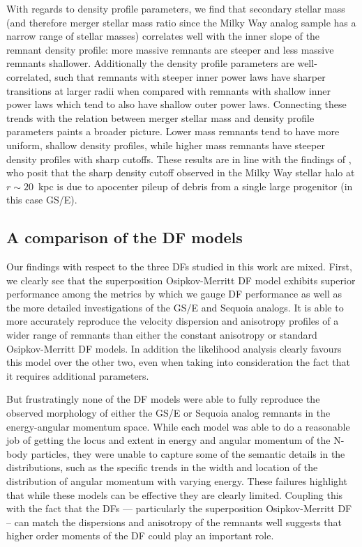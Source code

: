 With regards to density profile parameters, we find that secondary stellar mass (and therefore merger stellar mass ratio since the Milky Way analog sample has a narrow range of stellar masses) correlates well with the inner slope of the remnant density profile: more massive remnants are steeper and less massive remnants shallower. Additionally the density profile parameters are well-correlated, such that remnants with steeper inner power laws have sharper transitions at larger radii when compared with remnants with shallow inner power laws which tend to also have shallow outer power laws. Connecting these trends with the relation between merger stellar mass and density profile parameters paints a broader picture. Lower mass remnants tend to have more uniform, shallow density profiles, while higher mass remnants have steeper density profiles with sharp cutoffs. These results are in line with the findings of \textcite{deason18}, who posit that the sharp density cutoff observed in the Milky Way stellar halo at $r \sim 20$~kpc is due to apocenter pileup of debris from a single large progenitor (in this case GS/E).

\subsection{A comparison of the DF models}

Our findings with respect to the three DFs studied in this work are mixed. First, we clearly see that the superposition Osipkov-Merritt DF model exhibits superior performance among the metrics by which we gauge DF performance as well as the more detailed investigations of the GS/E and Sequoia analogs. It is able to more accurately reproduce the velocity dispersion and anisotropy profiles of a wider range of remnants than either the constant anisotropy or standard Osipkov-Merritt DF models. In addition the likelihood analysis clearly favours this model over the other two, even when taking into consideration the fact that it requires additional parameters.

But frustratingly none of the DF models were able to fully reproduce the observed morphology of either the GS/E or Sequoia analog remnants in the energy-angular momentum space. While each model was able to do a reasonable job of getting the locus and extent in energy and angular momentum of the N-body particles, they were unable to capture some of the semantic details in the distributions, such as the specific trends in the width and location of the distribution of angular momentum with varying energy. These failures highlight that while these models can be effective they are clearly limited. Coupling this with the fact that the DFs --- particularly the superposition Osipkov-Merritt DF -- can match the dispersions and anisotropy of the remnants well suggests that higher order moments of the DF could play an important role.

